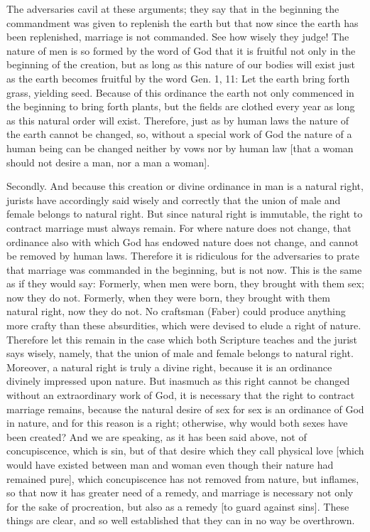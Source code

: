 The adversaries cavil at these arguments; they say that in the
beginning the commandment was given to replenish the earth but that
now since the earth has been replenished, marriage is not commanded.
See how wisely they judge!  The nature of men is so formed by the
word of God that it is fruitful not only in the beginning of the
creation, but as long as this nature of our bodies will exist just as
the earth becomes fruitful by the word Gen. 1, 11: Let the earth
bring forth grass, yielding seed.  Because of this ordinance the
earth not only commenced in the beginning to bring forth plants, but
the fields are clothed every year as long as this natural order will
exist.  Therefore, just as by human laws the nature of the earth
cannot be changed, so, without a special work of God the nature of a
human being can be changed neither by vows nor by human law [that a
woman should not desire a man, nor a man a woman].

Secondly.  And because this creation or divine ordinance in man is a
natural right, jurists have accordingly said wisely and correctly
that the union of male and female belongs to natural right.  But
since natural right is immutable, the right to contract marriage must
always remain.  For where nature does not change, that ordinance also
with which God has endowed nature does not change, and cannot be
removed by human laws.  Therefore it is ridiculous for the
adversaries to prate that marriage was commanded in the beginning,
but is not now.  This is the same as if they would say: Formerly,
when men were born, they brought with them sex; now they do not.
Formerly, when they were born, they brought with them natural right,
now they do not.  No craftsman (Faber) could produce anything more
crafty than these absurdities, which were devised to elude a right of
nature.  Therefore let this remain in the case which both Scripture
teaches and the jurist says wisely, namely, that the union of male
and female belongs to natural right.  Moreover, a natural right is
truly a divine right, because it is an ordinance divinely impressed
upon nature.  But inasmuch as this right cannot be changed without an
extraordinary work of God, it is necessary that the right to contract
marriage remains, because the natural desire of sex for sex is an
ordinance of God in nature, and for this reason is a right; otherwise,
why would both sexes have been created?  And we are speaking, as it
has been said above, not of concupiscence, which is sin, but of that
desire which they call physical love [which would have existed
between man and woman even though their nature had remained pure],
which concupiscence has not removed from nature, but inflames, so
that now it has greater need of a remedy, and marriage is necessary
not only for the sake of procreation, but also as a remedy [to guard
against sins].  These things are clear, and so well established that
they can in no way be overthrown.

